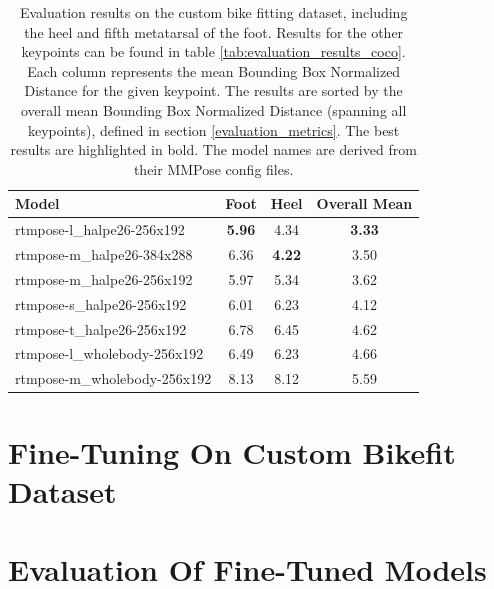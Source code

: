 \begin{table}[htbp]
    \centering
    \begin{tabular}{lccc}
        \toprule
        \textbf{Model}               & \textbf{Foot} & \textbf{Heel} & \textbf{Overall Mean} \\

        \midrule
        rtmpose-l\_halpe26-256x192   & \textbf{5.96} & 4.34          & \textbf{3.33}         \\
        rtmpose-m\_halpe26-384x288   & 6.36          & \textbf{4.22} & 3.50                  \\
        rtmpose-m\_halpe26-256x192   & 5.97          & 5.34          & 3.62                  \\
        rtmpose-s\_halpe26-256x192   & 6.01          & 6.23          & 4.12                  \\
        rtmpose-t\_halpe26-256x192   & 6.78          & 6.45          & 4.62                  \\
        rtmpose-l\_wholebody-256x192 & 6.49          & 6.23          & 4.66                  \\
        rtmpose-m\_wholebody-256x192 & 8.13          & 8.12          & 5.59                  \\
        \bottomrule
    \end{tabular}
    \caption{Evaluation results on the custom bike fitting dataset, including the heel and fifth metatarsal of the foot. Results for the other keypoints can be found in table \ref{tab:evaluation_results_coco}. Each column represents the mean Bounding Box Normalized Distance for the given keypoint. The results are sorted by the overall mean Bounding Box Normalized Distance (spanning all keypoints), defined in section \ref{evaluation_metrics}. The best results are highlighted in bold. The model names are derived from their MMPose config files.}
    \label{tab:evaluation_results_wholebody}

\end{table}


\section{Fine-Tuning On Custom Bikefit Dataset}
\label{fine_tuning}

\section{Evaluation Of Fine-Tuned Models}
\label{fine_tuning_results}

